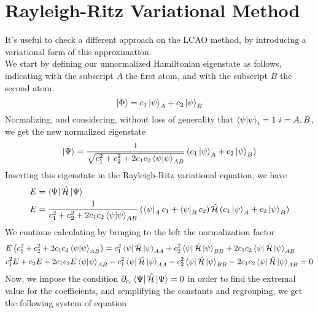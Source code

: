 \documentclass[../qm.tex]{subfiles}
\begin{document}
\section{Rayleigh-Ritz Variational Method}
	It's useful to check a different approach on the LCAO method, by introducing a variational form of this approximation.\\
	We start by defining our unnormalized Hamiltonian eigenstate as follows, indicating with the subscript $A$ the first atom, and with the subscript $B$ the second atom.\\
	\begin{equation}
		\ket{\Phi}=c_1\ket{\psi}_A+c_2\ket{\psi}_B
		\label{eq:unnormalizedvarLCAO}
	\end{equation}
	Normalizing, and considering, without loss of generality that $\braket{\psi}_i=1\ i=A,B$, we get the new normalized eigenstate
	\begin{equation}
		\ket{\Psi}=\frac{1}{\sqrt{c_1^2+c_2^2+2c_1c_2\bra{\psi}\ket{\psi}_{AB}}}\left( c_1\ket{\psi}_A+c_2\ket{\psi}_B \right)
		\label{eq:normalizedeigenstate}
	\end{equation}
	Inserting this eigenstate in the Rayleigh-Ritz variational equation, we have
	\begin{equation*}
		\begin{aligned}
			E&=\bra{\Psi}\hat{\mathcal{H}}\ket{\Psi}\\
			E&=\frac{1}{c_1^2+c_2^2+2c_1c_2\braket{\psi}_{AB}}\left( \bra{\psi}_Ac_1+\bra{\psi}_Bc_2 \right)\hat{\mathcal{H}}\left( c_1\ket{\psi}_A+c_2\ket{\psi}_B \right)
		\end{aligned}
	\end{equation*}
	We continue calculating by bringing to the left the normalization factor
	\begin{equation*}
		\begin{aligned}
			&E\left( c_1^2+c_2^2+2c_1c_2\braket{\psi}_{AB} \right)=c_1^2\bra{\psi}\hat{\mathcal{H}}\ket{\psi}_{AA}+c_2^2\bra{\psi}\hat{\mathcal{H}}\ket{\psi}_{BB}+2c_1c_2\bra{\psi}\hat{\mathcal{H}}\ket{\psi}_{AB}\\
			&c_1^2E+c_2E+2c_1c_2E\braket{\psi}_{AB}-c_1^2\bra{\psi}\hat{\mathcal{H}}\ket{\psi}_{AA}-c_2^2\bra{\psi}\hat{\mathcal{H}}\ket{\psi}_{BB}-2c_1c_2\bra{\psi}\hat{\mathcal{H}}\ket{\psi}_{AB}=0
	\end{aligned}
	\end{equation*}
	Now, we impose the condition $\partial_{c_i}\bra{\Psi}\hat{\mathcal{H}}\ket{\Psi}=0$ in order to find the extremal value for the coefficients, and semplifying the constants and regrouping, we get the following system of equation
\end{document}
